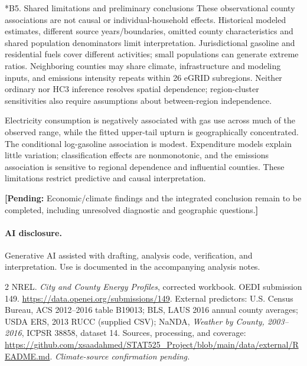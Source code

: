 \documentclass[11pt,letterpaper]{article}
\makeatletter
\renewcommand\subsection{\@startsection{subsection}{2}{0pt}{1.2ex plus .3ex minus .2ex}{.5ex}{\normalfont\normalsize\bfseries}}
\newcommand{\placeholder}[1]{\par{\small\color{blue!55!black}\textbf{[Pending:} #1\textbf{]}}\par}
\makeatother
\begin{document}
\subsection*{B5. Shared limitations and preliminary conclusions}
These observational county associations are not causal or individual-household effects. Historical modeled estimates, different source years/boundaries, omitted county characteristics and shared population denominators limit interpretation. Jurisdictional gasoline and residential fuels cover different activities; small populations can generate extreme ratios. Neighboring counties may share climate, infrastructure and modeling inputs, and emissions intensity repeats within 26 eGRID subregions. Neither ordinary nor HC3 inference resolves spatial dependence; region-cluster sensitivities also require assumptions about between-region independence.

Electricity consumption is negatively associated with gas use across much of the observed range, while the fitted upper-tail upturn is geographically concentrated. The conditional log-gasoline association is modest. Expenditure models explain little variation; classification effects are nonmonotonic, and the emissions association is sensitive to regional dependence and influential counties. These limitations restrict predictive and causal interpretation.
\placeholder{Economic/climate findings and the integrated conclusion remain to be completed, including unresolved diagnostic and geographic questions.}

\paragraph{AI disclosure.} Generative AI assisted with drafting, analysis code, verification, and interpretation. Use is documented in the accompanying analysis notes.

\begin{thebibliography}{2}\small
{} NREL. \emph{City and County Energy Profiles}, corrected workbook. OEDI submission 149. \url{https://data.openei.org/submissions/149}.
 External predictors: U.S. Census Bureau, ACS 2012--2016 table B19013; BLS, LAUS 2016 annual county averages; USDA ERS, 2013 RUCC (supplied CSV); NaNDA, \emph{Weather by County, 2003--2016}, ICPSR 38858, dataset 14. Sources, processing, and coverage: \url{https://github.com/xsaadahmed/STAT525_Project/blob/main/data/external/README.md}. \textit{Climate-source confirmation pending.}
\end{thebibliography}
\end{document}
